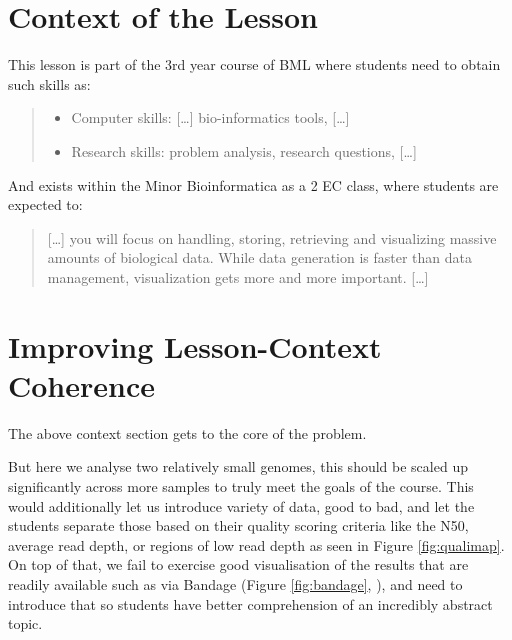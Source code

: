 \documentclass[paper=a4,justified,a4paper]{tufte-handout}
\providecommand{\tightlist}{%
  \setlength{\itemsep}{0pt}\setlength{\parskip}{0pt}}
\begin{document}
\hypertarget{context-of-the-lesson}{%
\section{Context of the Lesson}\label{context-of-the-lesson}}

This lesson is part of the 3rd year course of BML where students need to
obtain such skills as:

\begin{quote}
\begin{itemize}
\tightlist
\item
  Computer skills: {[}\ldots{}{]} bio-informatics tools, {[}\ldots{}{]}
\item
  Research skills: problem analysis, research questions, {[}\ldots{}{]}
\end{itemize}
\end{quote}

And exists within the Minor Bioinformatica as a 2 EC class, where
students are expected to:

\begin{quote}
{[}\ldots{}{]} you will focus on handling, storing, retrieving and
visualizing massive amounts of biological data. While data generation is
faster than data management, visualization gets more and more important.
{[}\ldots{}{]}
\end{quote}

\hypertarget{improving-lesson-context-coherence}{%
\section{Improving Lesson-Context
Coherence}\label{improving-lesson-context-coherence}}

The above context section gets to the core of the problem.

But here we analyse two relatively small genomes, this should be scaled
up significantly across more samples to truly meet the goals of the
course. This would additionally let us introduce variety of data, good
to bad, and let the students separate those based on their quality
scoring criteria like the N50, average read depth, or regions of low
read depth as seen in Figure \ref{fig:qualimap}. On top of that, we fail
to exercise good visualisation of the results that are readily available
such as via Bandage (Figure \ref{fig:bandage},
\citep{10.1093/bioinformatics/btv383}), and need to introduce that so
students have better comprehension of an incredibly abstract topic.
\end{document}

